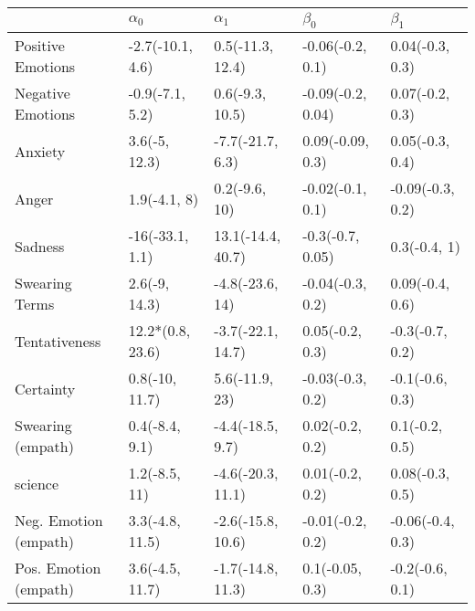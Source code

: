 \begin{tabular}{lllll}
\toprule
{} &        $\alpha_0$ &         $\alpha_1$ &          $\beta_0$ &         $\beta_1$ \\
\midrule
Positive Emotions     &  -2.7(-10.1, 4.6) &   0.5(-11.3, 12.4) &   -0.06(-0.2, 0.1) &   0.04(-0.3, 0.3) \\
Negative Emotions     &   -0.9(-7.1, 5.2) &    0.6(-9.3, 10.5) &  -0.09(-0.2, 0.04) &   0.07(-0.2, 0.3) \\
Anxiety               &     3.6(-5, 12.3) &   -7.7(-21.7, 6.3) &   0.09(-0.09, 0.3) &   0.05(-0.3, 0.4) \\
Anger                 &      1.9(-4.1, 8) &      0.2(-9.6, 10) &   -0.02(-0.1, 0.1) &  -0.09(-0.3, 0.2) \\
Sadness               &   -16(-33.1, 1.1) &  13.1(-14.4, 40.7) &   -0.3(-0.7, 0.05) &      0.3(-0.4, 1) \\
Swearing Terms        &     2.6(-9, 14.3) &    -4.8(-23.6, 14) &   -0.04(-0.3, 0.2) &   0.09(-0.4, 0.6) \\
Tentativeness         &  12.2*(0.8, 23.6) &  -3.7(-22.1, 14.7) &    0.05(-0.2, 0.3) &   -0.3(-0.7, 0.2) \\
Certainty             &    0.8(-10, 11.7) &     5.6(-11.9, 23) &   -0.03(-0.3, 0.2) &   -0.1(-0.6, 0.3) \\
Swearing (empath)     &    0.4(-8.4, 9.1) &   -4.4(-18.5, 9.7) &    0.02(-0.2, 0.2) &    0.1(-0.2, 0.5) \\
science               &     1.2(-8.5, 11) &  -4.6(-20.3, 11.1) &    0.01(-0.2, 0.2) &   0.08(-0.3, 0.5) \\
Neg. Emotion (empath) &   3.3(-4.8, 11.5) &  -2.6(-15.8, 10.6) &   -0.01(-0.2, 0.2) &  -0.06(-0.4, 0.3) \\
Pos. Emotion (empath) &   3.6(-4.5, 11.7) &  -1.7(-14.8, 11.3) &    0.1(-0.05, 0.3) &   -0.2(-0.6, 0.1) \\
\bottomrule
\end{tabular}

